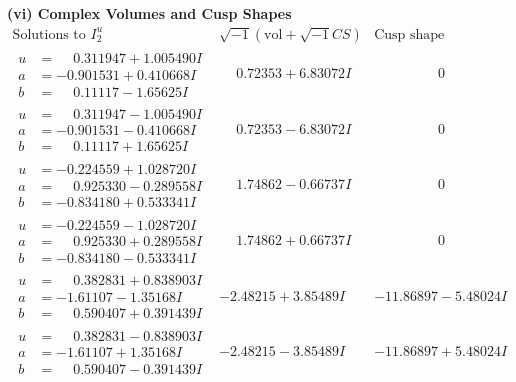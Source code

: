 \documentclass[1p]{elsarticle_modified}
\theoremstyle{definition}
\newcommand{\I}{\sqrt{-1}}
\begin{document}
\newpage\flushleft \textbf{(vi) Complex Volumes and Cusp Shapes}
$$\begin{array}{c|c|c}  
\text{Solutions to }I^u_{2}& \I (\text{vol} + \sqrt{-1}CS) & \text{Cusp shape}\\
 \hline 
\begin{aligned}
u &= \phantom{-}0.311947 + 1.005490 I \\
a &= -0.901531 + 0.410668 I \\
b &= \phantom{-}0.11117 - 1.65625 I\end{aligned}
 & \phantom{-}0.72353 + 6.83072 I & \phantom{-0.000000 } 0 \\ \hline\begin{aligned}
u &= \phantom{-}0.311947 - 1.005490 I \\
a &= -0.901531 - 0.410668 I \\
b &= \phantom{-}0.11117 + 1.65625 I\end{aligned}
 & \phantom{-}0.72353 - 6.83072 I & \phantom{-0.000000 } 0 \\ \hline\begin{aligned}
u &= -0.224559 + 1.028720 I \\
a &= \phantom{-}0.925330 - 0.289558 I \\
b &= -0.834180 + 0.533341 I\end{aligned}
 & \phantom{-}1.74862 - 0.66737 I & \phantom{-0.000000 } 0 \\ \hline\begin{aligned}
u &= -0.224559 - 1.028720 I \\
a &= \phantom{-}0.925330 + 0.289558 I \\
b &= -0.834180 - 0.533341 I\end{aligned}
 & \phantom{-}1.74862 + 0.66737 I & \phantom{-0.000000 } 0 \\ \hline\begin{aligned}
u &= \phantom{-}0.382831 + 0.838903 I \\
a &= -1.61107 - 1.35168 I \\
b &= \phantom{-}0.590407 + 0.391439 I\end{aligned}
 & -2.48215 + 3.85489 I & -11.86897 - 5.48024 I \\ \hline\begin{aligned}
u &= \phantom{-}0.382831 - 0.838903 I \\
a &= -1.61107 + 1.35168 I \\
b &= \phantom{-}0.590407 - 0.391439 I\end{aligned}
 & -2.48215 - 3.85489 I & -11.86897 + 5.48024 I \\ \hline\begin{aligned}

\end{aligned}
\end{array}$$
\end{document}
